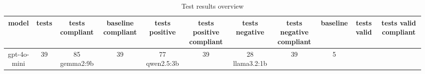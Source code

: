 
  \begin{table}[h!]
  \centering
  \begin{tabular}{|c|c|c|c|c|c|c|c|c|c|c|}
  \hline
  model & tests & tests compliant & baseline compliant & tests positive & tests positive compliant & tests negative & tests negative compliant & baseline & tests valid & tests valid compliant \\
  \hline
  gpt-4o-mini & 39 & 85%
\hline
gemma2:9b & 39 & 77%
\hline
qwen2.5:3b & 39 & 28%
\hline
llama3.2:1b & 39 & 5%
  \end{tabular}
  \caption{Test results overview}
  
  \end{table}
  